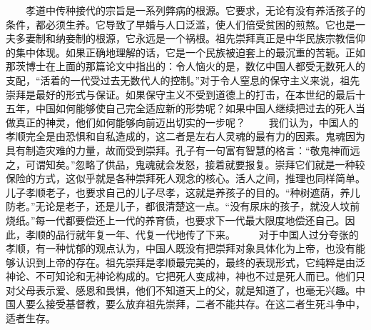 \documentclass[12pt,oneside]{book}
\begin{document}
\begin{common-format}
　　孝道中传种接代的宗旨是一系列弊病的根源。它要求，无论有没有养活孩子的条件，都必须生养。它导致了早婚与人口泛滥，使人们倍受贫困的煎熬。它也是一夫多妻制和纳妾制的根源，它永远是一个祸根。祖先崇拜真正是中华民族宗教信仰的集中体现。如果正确地理解的话，它是一个民族被迫套上的最沉重的苦轭。正如那茨博士在上面的那篇论文中指出的：令人恼火的是，数亿中国人都受无数死人的支配，“活着的一代受过去无数代人的控制。”对于令人窒息的保守主义来说，祖先崇拜是最好的形式与保证。如果保守主义不受到道德上的打击，在本世纪的最后十五年，中国如何能够使自己完全适应新的形势呢？如果中国人继续把过去的死人当做真正的神灵，他们如何能够向前迈出切实的一步呢？ 
　　我们认为，中国人的孝顺完全是由恐惧和自私造成的，这二者是左右人灵魂的最有力的因素。鬼魂因为具有制造灾难的力量，故而受到崇拜。孔子有一句富有智慧的格言：“敬鬼神而远之，可谓知矣。”忽略了供品，鬼魂就会发怒，接着就要报复。崇拜它们就是一种较保险的方式，这似乎就是各种崇拜死人观念的核心。活人之间，推理也同样简单。儿子孝顺老子，也要求自己的儿子尽孝，这就是养孩子的目的。“种树遮荫，养儿防老。”无论是老子，还是儿子，都很清楚这一点。“没有尿床的孩子，就没人坟前烧纸。”每一代都要偿还上一代的养育债，也要求下一代最大限度地偿还自己。因此，孝顺的品行就年复一年、代复一代地传了下来。 
　　对于中国人过分夸张的孝顺，有一种忧郁的观点认为，中国人既没有把崇拜对象具体化为上帝，也没有能够认识到上帝的存在。祖先崇拜是孝顺最完美的，最终的表现形式，它纯粹是由泛神论、不可知论和无神论构成的。它把死人变成神，神也不过是死人而已。他们只对父母表示爱、感恩和畏惧，他们不知道天上的父，就是知道了，也毫无兴趣。中国人要么接受基督教，要么放弃祖先崇拜，二者不能共存。在这二者生死斗争中，适者生存。




\end{common-format}
\end{document}
